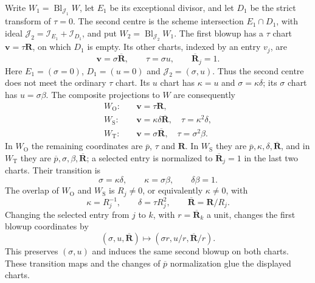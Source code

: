 \documentclass[11pt,a4paper]{article}
\numberwithin{equation}{section}
\theoremstyle{plain}
\theoremstyle{definition}
\theoremstyle{remark}
\begin{document}
Write $W_1=\operatorname{Bl}_{\mathcal J_1}W$, let $E_1$ be its
exceptional divisor, and let $D_1$ be the strict transform of $\tau=0$.
The second centre is the scheme intersection $E_1\cap D_1$, with ideal
$\mathcal J_2=\mathcal I_{E_1}+\mathcal I_{D_1}$, and put
$W_2=\operatorname{Bl}_{\mathcal J_2}W_1$.
The first blowup has a $\tau$ chart
$\boldsymbol v=\tau\boldsymbol R$, on which $D_1$ is empty.
Its other charts, indexed by an entry $v_j$, are
\[
 \boldsymbol v=\sigma\overline{\boldsymbol R},\qquad
 \tau=\sigma u,\qquad \overline{\boldsymbol R}_j=1.
\]
Here $E_1=(\sigma=0)$, $D_1=(u=0)$ and
$\mathcal J_2=(\sigma,u)$. Thus the second centre does not meet the
ordinary $\tau$ chart. Its $u$ chart has $\kappa=u$ and
$\sigma=\kappa\delta$; its $\sigma$ chart has $u=\sigma\beta$.
The composite projections to $W$ are consequently
\begin{align*}
 W_{\mathrm O}:&\quad \boldsymbol v=\tau\boldsymbol R,\\
 W_{\mathrm S}:&\quad \boldsymbol v=\kappa\delta\overline{\boldsymbol R},
                 \quad\tau=\kappa^2\delta,\\
 W_{\mathrm T}:&\quad \boldsymbol v=\sigma\overline{\boldsymbol R},
                 \quad\tau=\sigma^2\beta.
\end{align*}
In $W_{\mathrm O}$ the remaining coordinates are $\overline p$,
$\tau$ and $\boldsymbol R$. In $W_{\mathrm S}$ they are
$\overline p,\kappa,\delta,\overline{\boldsymbol R}$, and in
$W_{\mathrm T}$ they are $\overline p,\sigma,\beta,
\overline{\boldsymbol R}$; a selected entry is normalized to
$\overline{\boldsymbol R}_j=1$ in the last two charts.
Their transition is
\[
 \sigma=\kappa\delta,\qquad \kappa=\sigma\beta,
 \qquad\delta\beta=1.
\]
The overlap of $W_{\mathrm O}$ and $W_{\mathrm S}$ is $R_j\ne0$,
or equivalently $\kappa\ne0$, with
\[
 \kappa=R_j^{-1},\qquad \delta=\tau R_j^2,\qquad
 \overline{\boldsymbol R}=\boldsymbol R/R_j.
\]
Changing the selected entry from $j$ to $k$, with
$r=\overline{\boldsymbol R}_k$ a unit, changes the first blowup coordinates by
\[
 (\sigma,u,\overline{\boldsymbol R})
       \longmapsto(\sigma r,u/r,\overline{\boldsymbol R}/r).
\]
This preserves $(\sigma,u)$ and induces the same second blowup on
both charts. These transition maps and the changes of
$\overline p$ normalization glue the displayed charts.
\end{document}
